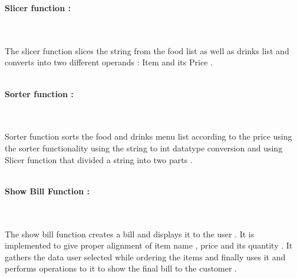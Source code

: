 \documentclass[11pt, a4paper]{article}
\begin{document}
\begin{left}
    \textbf{\Large{Slicer function :}}
\end{left}
\\\\
\large{{The slicer function slices the string from the food\vspace{2mm} list as well as drinks list and converts into two different operands : Item and its Price .
}}
\\\\
\vspace{0.7cm}

\begin{left}
    \textbf{\Large{Sorter function :}}
\end{left}
\\\\
\large{{Sorter function sorts the food and drinks \vspace{2mm} menu list according to the price using the sorter functionality
using the string \vspace{2mm} to int datatype conversion and using Slicer function that divided a string into two parts .}}
\\\\
\vspace{0.8cm}

\begin{left}
    \textbf{\Large{Show Bill Function :}}
\end{left}
\\\\
\large{{The show bill function creates a bill \vspace{2mm}and displays it to the user . It is implemented to give proper alignment of item name , price \vspace{2mm}and its quantity . It gathers the data user selected while ordering the items and finally\vspace{2mm} uses it and performs operations to it to show the final bill to the customer .}}
\\\\
\vspace{1.5cm}
\end{document}
